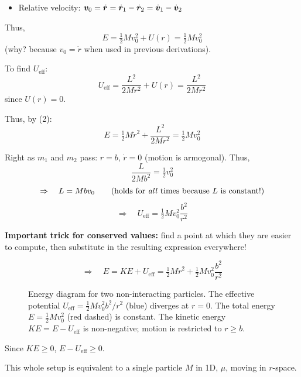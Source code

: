 \begin{example}
\begin{itemize}
  \item Relative velocity: $\bm{v}_0 = \dot{\bm{r}} = \dot{\bm{r}}_1 - \dot{\bm{r}}_2 = \dot{\bm{v}}_1 - \dot{\bm{v}}_2$
\end{itemize}

Thus,
\[
  E = \tfrac{1}{2}Mv_0^2 + U(r) = \tfrac{1}{2}M v_0^2
\]
(why? because $v_0 = \dot{r}$ when used in previous derivations).

To find $U_\text{eff}$:
\[
  U_\text{eff} = \frac{L^2}{2Mr^2} + U(r) = \frac{L^2}{2Mr^2}
\]
since $U(r) = 0$.

Thus, by (2):
\[
  E = \tfrac{1}{2}M\dot{r}^2 + \frac{L^2}{2Mr^2} = \tfrac{1}{2}Mv_0^2
\]

Right as $m_1$ and $m_2$ pass: $r = b$, $\dot{r} = 0$ (motion is armogonal). Thus,
\[
  \frac{L}{2Mb^2} = \tfrac{1}{2}v_0^2
\]
\[
  \Rightarrow \quad L = Mbv_0 \qquad \text{(holds for \emph{all} times because $L$ is constant!)}
\]
\[
  \Rightarrow \quad \boxed{U_\text{eff} = \tfrac{1}{2}Mv_0^2 \frac{b^2}{r^2}}
\]

\textbf{Important trick for conserved values:} find a point at which they are easier to compute, then substitute in the resulting expression everywhere!

\[
  \Rightarrow \quad E = KE + U_\text{eff} = \tfrac{1}{2}M\dot{r}^2 + \tfrac{1}{2}Mv_0^2\frac{b^2}{r^2}
\]

\begin{figure}[H]
\begin{center}
\end{center}
\caption{Energy diagram for two non-interacting particles. The effective potential $U_\text{eff} = \frac{1}{2}Mv_0^2 b^2/r^2$ (blue) diverges at $r=0$. The total energy $E = \frac{1}{2}Mv_0^2$ (red dashed) is constant. The kinetic energy $KE = E - U_\text{eff}$ is non-negative; motion is restricted to $r \geq b$.}
\label{fig:eff_pot_centrifugal}
\end{figure}

Since $KE \geq 0$, $E - U_\text{eff} \geq 0$.

This whole setup is equivalent to a single particle $M$ in 1D, $\mu$, moving in $r$-space.
\end{example}

